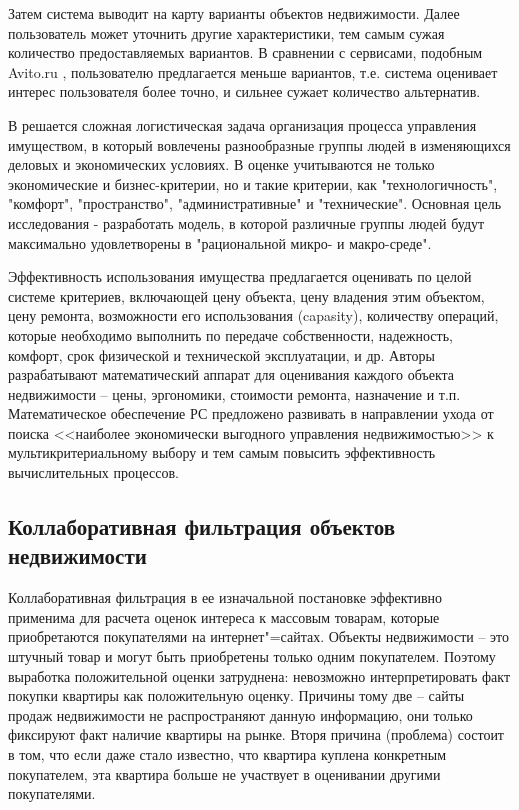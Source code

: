\documentclass[a4paper,14pt,openany,final]{extreport} %
\begin{document}
Затем система выводит на карту варианты объектов недвижимости. Далее пользователь может уточнить другие характеристики, тем самым сужая количество предоставляемых вариантов. В сравнении с сервисами, подобным Avito.ru \cite{avito}, пользователю предлагается меньше вариантов, т.е. система оценивает интерес пользователя более точно, и сильнее сужает количество альтернатив.

В \cite{Ginevichius} решается сложная логистическая задача организация процесса управления имуществом, в который вовлечены разнообразные группы людей в изменяющихся деловых и экономических условиях. В оценке учитываются не только экономические и бизнес-критерии, но и такие критерии, как "технологичность", "комфорт", "пространство", "административные" и "технические". Основная цель исследования - разработать модель, в которой различные группы людей будут максимально удовлетворены в "рациональной микро- и макро-среде".

Эффективность использования имущества предлагается оценивать по целой системе критериев, включающей цену объекта, цену владения этим объектом, цену ремонта, возможности его использования (capasity), количеству операций, которые необходимо выполнить по передаче собственности, надежность, комфорт, срок физической и технической эксплуатации, и др. Авторы разрабатывают математический аппарат для оценивания каждого объекта недвижимости – цены, эргономики, стоимости ремонта, назначение и т.п. Математическое обеспечение РС предложено развивать в направлении ухода от поиска <<наиболее экономически выгодного управления недвижимостью>> к мультикритериальному выбору и тем самым повысить эффективность вычислительных процессов.

\subsection{Коллаборативная фильтрация объектов недвижимости} %
\label{sec:coll-filtering-rspo}

Коллаборативная фильтрация в ее изначальной постановке эффективно применима для расчета оценок интереса к массовым товарам, которые приобретаются покупателями на интернет"=сайтах.  Объекты недвижимости -- это штучный товар и могут быть приобретены только одним покупателем. Поэтому выработка положительной оценки затруднена: невозможно интерпретировать факт покупки квартиры как положительную оценку. Причины тому две -- сайты продаж недвижимости не распространяют данную информацию, они только фиксируют факт наличие квартиры на рынке. Вторя причина (проблема) состоит в том, что если даже стало известно, что квартира куплена конкретным покупателем, эта квартира больше не участвует в оценивании другими покупателями.
\end{document}
